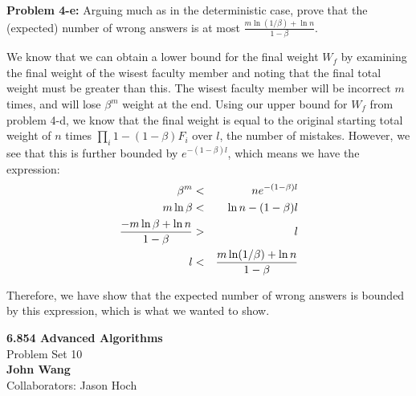\documentclass[psamsfonts]{amsart}
\newenvironment{sol}{\vspace{0.25cm}{\large \bfseries Solution:}}{\qedsymbol}
\newenvironment{prob}[1]{\begin{framed}{\large \bfseries Problem #1:}}{\end{framed}}
\newcommand{\makenewtitle}{
    \begin{center}
    {\huge \bfseries 6.854 Advanced Algorithms} \\
    Problem Set 10\\
    \vspace{0.25cm}
    {\bfseries John Wang} \\
    Collaborators: Jason Hoch 
    \end{center}
    \vspace{0.5cm}
}
\begin{document}
\begin{prob}{4-e}
Arguing much as in the deterministic case, prove that the (expected) number of wrong answers is at most $\frac{m \ln (1/\beta) + \ln n}{1 - \beta}$. 
\end{prob}
\begin{sol}
We know that we can obtain a lower bound for the final weight $W_f$ by examining the final weight of the wisest faculty member and noting that the final total weight must be greater than this. The wisest faculty member will be incorrect $m$ times, and will lose $\beta^m$ weight at the end. Using our upper bound for $W_f$ from problem 4-d, we know that the final weight is equal to the original starting total weight of $n$ times $\prod_i 1 - (1 - \beta)F_i$ over $l$, the number of mistakes. However, we see that this is further bounded by $e^{-(1 - \beta) l}$, which means we have the expression:
\begin{eqnarray}
\beta^m &<& n e^{-(1 - \beta) l} \\
m \ln \beta &<& \ln n - (1 - \beta) l \\
{{-m \ln \beta + \ln n} \over {1 - \beta}} &>& l \\
l &<& {{m \ln (1/\beta) + \ln n} \over {1 - \beta}}
\end{eqnarray}

Therefore, we have show that the expected number of wrong answers is bounded by this expression, which is what we wanted to show.
\end{sol}

\newpage
\makenewtitle
\end{document}
